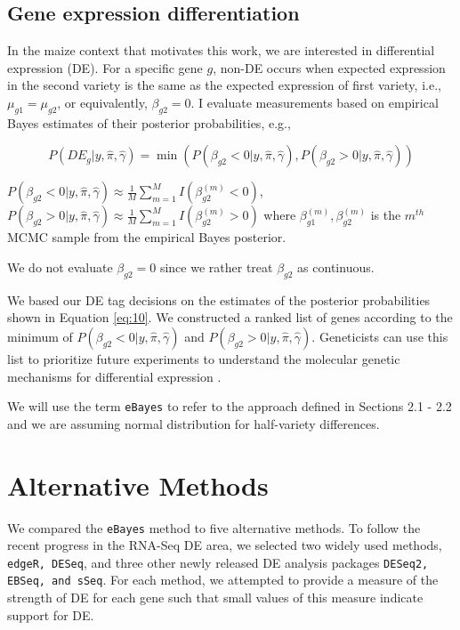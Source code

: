 \subsection{Gene expression differentiation}

In the maize context that motivates this work, we are interested in differential expression (DE). For a specific gene $g$, non-DE occurs when expected expression in the second variety is the same as the expected expression of first variety, i.e., $\mu_{g1} = \mu_{g2}$, or equivalently, $\beta_{g2}=0$.  I evaluate measurements based on empirical Bayes estimates of their posterior probabilities, e.g., 

\begin{equation}
\label{eq:10}
P(DE_g | y, \hat{\pi}, \hat{\gamma}) =\min( P(\beta_{g2}< 0 | y, \hat{\pi}, \hat{\gamma}),  P(\beta_{g2}> 0 | y, \hat{\pi}, \hat{\gamma}))
\end{equation}

$P(\beta_{g2}< 0 | y, \hat{\pi}, \hat{\gamma}) \approx \frac{1}{M} \sum_{m=1}^M I(\beta_{g2} ^ {(m)} < 0)$, $P(\beta_{g2}> 0 | y, \hat{\pi}, \hat{\gamma}) \approx \frac{1}{M} \sum_{m=1}^M I(\beta_{g2} ^ {(m)} > 0) $
where $\beta_{g1}^{(m)}, \beta_{g2}^{(m)}$ is the $m^{th}$ MCMC sample from the empirical Bayes posterior.

We do not evaluate $\beta_{g2}=0$ since we rather treat $\beta_{g2}$ as continuous. 

We based our DE tag decisions on the estimates of the posterior probabilities shown in Equation \eqref{eq:10}. We constructed a ranked list of genes according to the minimum of $P(\beta_{g2}< 0 | y, \hat{\pi}, \hat{\gamma})$ and $P(\beta_{g2}> 0 | y, \hat{\pi}, \hat{\gamma})$. Geneticists can use this list to prioritize future experiments to understand the molecular genetic mechanisms for differential expression \citep{niemi2015empirical}. 

We will use the term \texttt{eBayes} to refer to the approach defined in Sections 2.1 - 2.2 and we are assuming normal distribution for half-variety differences.

\section{Alternative Methods}

We compared the \texttt{eBayes} method to five alternative methods. To follow the recent progress in the RNA-Seq DE area, we selected two widely used methods, {\tt edgeR, DESeq}, and three other newly released DE analysis packages {\tt DESeq2, EBSeq, and sSeq}. For each method, we attempted to provide a measure of the strength of DE for each gene such that small values of this measure indicate support for DE. 

